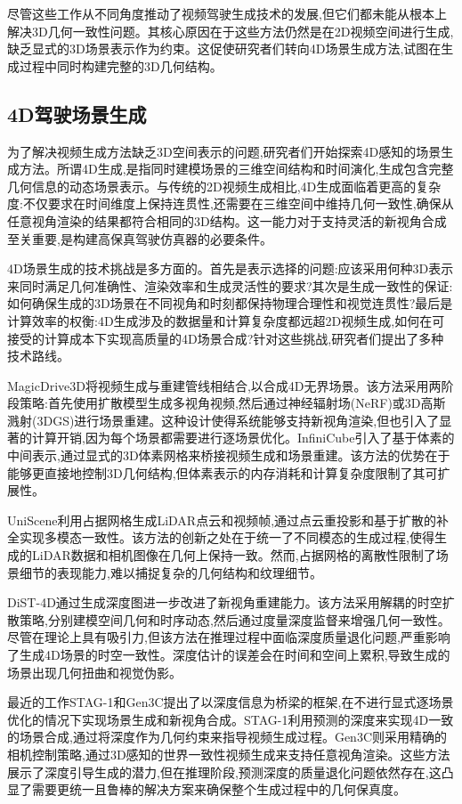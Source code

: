 尽管这些工作从不同角度推动了视频驾驶生成技术的发展,但它们都未能从根本上解决3D几何一致性问题。其核心原因在于这些方法仍然是在2D视频空间进行生成,缺乏显式的3D场景表示作为约束。这促使研究者们转向4D场景生成方法,试图在生成过程中同时构建完整的3D几何结构。

\subsection{4D驾驶场景生成}

为了解决视频生成方法缺乏3D空间表示的问题,研究者们开始探索4D感知的场景生成方法。所谓4D生成,是指同时建模场景的三维空间结构和时间演化,生成包含完整几何信息的动态场景表示。与传统的2D视频生成相比,4D生成面临着更高的复杂度:不仅要求在时间维度上保持连贯性,还需要在三维空间中维持几何一致性,确保从任意视角渲染的结果都符合相同的3D结构。这一能力对于支持灵活的新视角合成至关重要,是构建高保真驾驶仿真器的必要条件。

4D场景生成的技术挑战是多方面的。首先是表示选择的问题:应该采用何种3D表示来同时满足几何准确性、渲染效率和生成灵活性的要求?其次是生成一致性的保证:如何确保生成的3D场景在不同视角和时刻都保持物理合理性和视觉连贯性?最后是计算效率的权衡:4D生成涉及的数据量和计算复杂度都远超2D视频生成,如何在可接受的计算成本下实现高质量的4D场景合成?针对这些挑战,研究者们提出了多种技术路线。

MagicDrive3D\cite{gao2024magicdrive3d}将视频生成与重建管线相结合,以合成4D无界场景。该方法采用两阶段策略:首先使用扩散模型生成多视角视频,然后通过神经辐射场(NeRF)或3D高斯溅射(3DGS)进行场景重建。这种设计使得系统能够支持新视角渲染,但也引入了显著的计算开销,因为每个场景都需要进行逐场景优化。InfiniCube\cite{lu2024infinicube}引入了基于体素的中间表示,通过显式的3D体素网格来桥接视频生成和场景重建。该方法的优势在于能够更直接地控制3D几何结构,但体素表示的内存消耗和计算复杂度限制了其可扩展性。

UniScene\cite{li2025uniscene}利用占据网格生成LiDAR点云和视频帧,通过点云重投影和基于扩散的补全实现多模态一致性。该方法的创新之处在于统一了不同模态的生成过程,使得生成的LiDAR数据和相机图像在几何上保持一致。然而,占据网格的离散性限制了场景细节的表现能力,难以捕捉复杂的几何结构和纹理细节。

DiST-4D\cite{guo2025dist4d}通过生成深度图进一步改进了新视角重建能力。该方法采用解耦的时空扩散策略,分别建模空间几何和时序动态,然后通过度量深度监督来增强几何一致性。尽管在理论上具有吸引力,但该方法在推理过程中面临深度质量退化问题,严重影响了生成4D场景的时空一致性。深度估计的误差会在时间和空间上累积,导致生成的场景出现几何扭曲和视觉伪影。

最近的工作STAG-1\cite{wang2024stag1}和Gen3C\cite{ren2025gen3c}提出了以深度信息为桥梁的框架,在不进行显式逐场景优化的情况下实现场景生成和新视角合成。STAG-1利用预测的深度来实现4D一致的场景合成,通过将深度作为几何约束来指导视频生成过程。Gen3C则采用精确的相机控制策略,通过3D感知的世界一致性视频生成来支持任意视角渲染。这些方法展示了深度引导生成的潜力,但在推理阶段,预测深度的质量退化问题依然存在,这凸显了需要更统一且鲁棒的解决方案来确保整个生成过程中的几何保真度。


